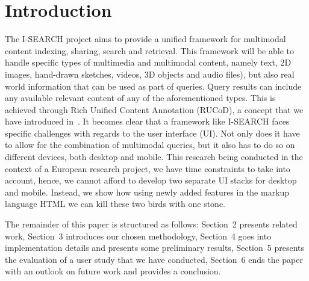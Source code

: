 \documentclass[runningheads,a4paper]{llncs} \usepackage[utf8]{inputenc}
\begin{document}
\section{Introduction}
The \mbox{I-SEARCH} project aims to provide a unified framework for multimodal content indexing, sharing, search and retrieval. This framework will be able to handle specific types of multimedia and multimodal content, namely text, 2D images, hand-drawn sketches, videos, 3D objects and audio files), but also real world information that can be used as part of queries. Query results can include any available relevant content of any of the aforementioned types. This is achieved through Rich Unified Content Annotation (RUCoD), a concept that we have introduced in~\cite{ijmis}. It becomes clear that a framework like \mbox{I-SEARCH} faces specific challenges with regards to the user interface (UI). Not only does it have to allow for the combination of multimodal queries, but it also has to do so on different devices, both desktop and mobile. This research being conducted in the context of a European research project, we have time constraints to take into account, hence, we cannot afford to develop two separate UI stacks for desktop and mobile. Instead, we show how using newly added features in the markup language HTML  we can kill these two birds with one stone.

The remainder of this paper is structured as follows: Section~2 presents related work, Section~3 introduces our chosen methodology, Section~4 goes into implementation details and presents some preliminary results, Section~5 presents the evaluation of a user study that we have conducted, Section~6 ends the paper with an outlook on future work and provides a conclusion.
\end{document}
